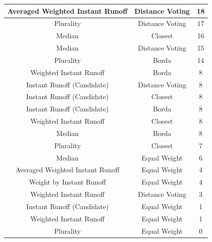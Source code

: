 \begin{table}[htbp]
\begin{tabular}{|c|c|c|}
        \hline
        Averaged Weighted Instant Runoff & Distance Voting     & 18                  \\
        \hline
        Plurality                        & Distance Voting     & 17                  \\
        \hline
        Median                           & Closest             & 16                  \\
        \hline
        Median                           & Distance Voting     & 15                  \\
        \hline
        Plurality                        & Borda               & 14                  \\
        \hline
        Weighted Instant Runoff          & Borda               & 8                   \\
        \hline
        Instant Runoff (Candidate)       & Distance Voting     & 8                   \\
        \hline
        Instant Runoff (Candidate)       & Closest             & 8                   \\
        \hline
        Instant Runoff (Candidate)       & Borda               & 8                   \\
        \hline
        Weighted Instant Runoff          & Closest             & 8                   \\
        \hline
        Median                           & Borda               & 8                   \\
        \hline
        Plurality                        & Closest             & 7                   \\
        \hline
        Median                           & Equal Weight        & 6                   \\
        \hline
        Averaged Weighted Instant Runoff & Equal Weight        & 4                   \\
        \hline
        Weight by Instant Runoff         & Equal Weight        & 4                   \\
        \hline
        Weighted Instant Runoff          & Distance Voting     & 3                   \\
        \hline
        Instant Runoff (Candidate)       & Equal Weight        & 1                   \\
        \hline
        Weighted Instant Runoff          & Equal Weight        & 1                   \\
        \hline
        Plurality                        & Equal Weight        & 0                   \\
        \hline
    \end{tabular}
\end{table}


